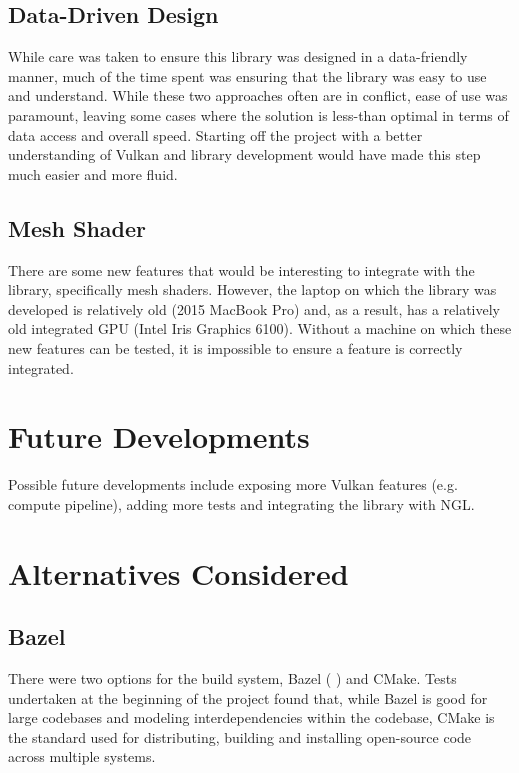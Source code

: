 \documentclass[12pt]{report}
\newcommand{\citebu}[1]{(\citenoparen{#1})}
\newcommand{\citenoparen}[1]{\citeauthor{#1} \citeyear{#1}}
\theoremstyle{definition}
\begin{document}
    \subsection{Data-Driven Design}

      While care was taken to ensure this library was designed in a data-friendly
      manner, much of the time spent was ensuring that the library was easy to
      use and understand. While these two approaches often are in conflict, ease of
      use was paramount, leaving some cases where the solution is less-than
      optimal in terms of data access and overall speed. Starting off the
      project with a better understanding of Vulkan and library development
      would have made this step much easier and more fluid.

    \subsection{Mesh Shader}

      There are some new features that would be interesting to integrate with
      the library, specifically mesh shaders. However, the laptop on which
      the library was developed is relatively old (2015 MacBook Pro) and,
      as a result, has a relatively old integrated GPU (Intel Iris Graphics 6100).
      Without a machine on which these new features can be tested, it
      is impossible to ensure a feature is correctly integrated.

  \section{Future Developments}
    
    Possible future developments include exposing more Vulkan features
    (e.g. compute pipeline), adding more tests and integrating the library with
    NGL.

  \section{Alternatives Considered}

    \subsection{Bazel}

      There were two options for the build system, Bazel \citebu{bazel} and CMake.
      Tests undertaken at the beginning of the
      project found that, while Bazel is good for large codebases and
      modeling interdependencies within the codebase, CMake is the
      standard used for distributing, building and installing
      open-source code across multiple systems.
\end{document}
